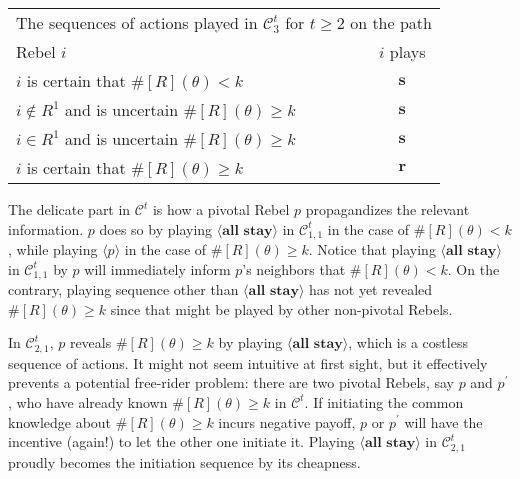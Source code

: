 \documentclass[12pt,letter]{article}
\newcommand{\Kappa}{\mathcal{C}}
\theoremstyle{definition}
\theoremstyle{remark}
\theoremstyle{claim}
\begin{document}
\begin{table}[!htbp]
\begin{center}
\begin{tabular}{l c}
\multicolumn{2}{c}{The sequences of actions played in $\Kappa^t_{3}$ for $t\geq 2$ on the path}\\
Rebel $i$ 	 	&  	$i$ plays		 \\
\hline
\hline
$i$ is certain that $\#[R](\theta)<k$ 	& 	$\textbf{s}$	\\
$i\notin R^{1}$ and is uncertain $\#[R](\theta)\geq k$	& 	$ \textbf{s} $	\\
$i\in R^{1}$ and is uncertain $\#[R](\theta)\geq k$ &  $ \textbf{s} $  \\
$i$ is certain that $\#[R](\theta)\geq k$ &  $ \textbf{r} $  \\
\hline
\end{tabular}
\end{center}
\end{table}


The delicate part in $\Kappa^t$ is how a pivotal Rebel $p$ propagandizes the relevant information. $p$ does so by playing $\langle \textbf{all stay} \rangle$ in $\Kappa^{t}_{1,1}$ in the case of $\#[R](\theta)< k$, while playing $\langle p \rangle$ in the case of $\#[R](\theta)\geq k$. Notice that playing $\langle \textbf{all stay} \rangle$ in $\Kappa^{t}_{1,1}$ by $p$ will immediately inform $p$'s neighbors that $\#[R](\theta)< k$. On the contrary, playing sequence other than $\langle \textbf{all stay} \rangle$ has not yet revealed $\#[R](\theta)\geq k$ since that might be played by other non-pivotal Rebels. 

In $\Kappa^{t}_{2,1}$, $p$ reveals $\#[R](\theta)\geq k$ by playing $\langle \textbf{all stay} \rangle$, which is a costless sequence of actions. It might not seem intuitive at first sight, but it effectively prevents a potential free-rider problem: there are two pivotal Rebels, say $p$ and $p^{'}$, who have already known $\#[R](\theta)\geq k$ in $\Kappa^t$. If initiating the common knowledge about $\#[R](\theta)\geq k$ incurs negative payoff, $p$ or $p^{'}$ will have the incentive (again!) to let the other one initiate it. Playing $\langle \textbf{all stay} \rangle$ in $\Kappa^t_{2,1}$ proudly becomes the initiation sequence by its cheapness.
\end{document}

